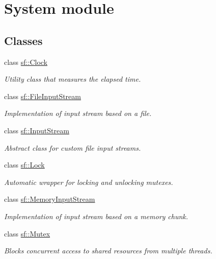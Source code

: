 \hypertarget{group__system}{}\section{System module}
\label{group__system}
\subsection*{Classes}
\begin{DoxyCompactItemize}
\item 
class \mbox{\hyperlink{classsf_1_1_clock}{sf\+::\+Clock}}
\begin{DoxyCompactList}\small\item\em Utility class that measures the elapsed time. \end{DoxyCompactList}\item 
class \mbox{\hyperlink{classsf_1_1_file_input_stream}{sf\+::\+File\+Input\+Stream}}
\begin{DoxyCompactList}\small\item\em Implementation of input stream based on a file. \end{DoxyCompactList}\item 
class \mbox{\hyperlink{classsf_1_1_input_stream}{sf\+::\+Input\+Stream}}
\begin{DoxyCompactList}\small\item\em Abstract class for custom file input streams. \end{DoxyCompactList}\item 
class \mbox{\hyperlink{classsf_1_1_lock}{sf\+::\+Lock}}
\begin{DoxyCompactList}\small\item\em Automatic wrapper for locking and unlocking mutexes. \end{DoxyCompactList}\item 
class \mbox{\hyperlink{classsf_1_1_memory_input_stream}{sf\+::\+Memory\+Input\+Stream}}
\begin{DoxyCompactList}\small\item\em Implementation of input stream based on a memory chunk. \end{DoxyCompactList}\item 
class \mbox{\hyperlink{classsf_1_1_mutex}{sf\+::\+Mutex}}
\begin{DoxyCompactList}\small\item\em Blocks concurrent access to shared resources from multiple threads. \end{DoxyCompactList}\item 

\end{DoxyCompactItemize}
